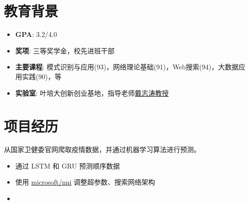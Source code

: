 \documentclass{resume}
\begin{document}




\section{\faGraduationCap \: 教育背景}
\begin{itemize}
    \item \textbf{GPA}: 3.2/4.0
    \item \textbf{奖项}: 三等奖学金，校先进班干部
    \item \textbf{主要课程}: 模式识别与应用(93)，网络理论基础(91)，Web搜索(94)，大数据应用实践(90)，等
\end{itemize}

\begin{itemize}
    \item \textbf{实验室}: 叶培大创新创业基地，指导老师\href{https://teacher.bupt.edu.cn/dai/zh_CN/index.htm}{戴志涛教授}
\end{itemize}


\section{\faSearch \: 项目经历}
从国家卫健委官网爬取疫情数据，并通过机器学习算法进行预测。
\begin{itemize}
  \item 通过 LSTM 和 GRU 预测顺序数据
  \item 使用 \href{https://github.com/microsoft/nni}{microsoft/nni} 调整超参数、搜索网络架构
  \item {}
\end{itemize}
\end{document}
